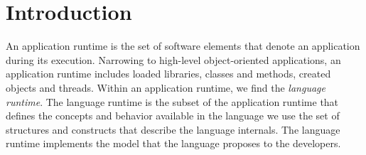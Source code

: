 
\chapter{Introduction}
\minitoc


%
%


An application runtime is the set of software elements that denote an application during its execution. Narrowing to high-level object-oriented applications, an application runtime includes \eg loaded libraries, classes and methods, created objects and threads. Within an application runtime, we find the \emph{language runtime}. The language runtime is the subset of the application runtime that defines the concepts and behavior available in the language we use \ie the set of structures and constructs that describe the language internals. The language runtime implements the model that the language proposes to the developers.

